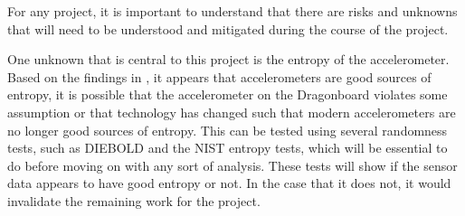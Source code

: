 For any project, it is important to understand that there are risks and unknowns
that will need to be understood and mitigated during the course of the project.

One unknown that is central to this project is the entropy of the accelerometer.
Based on the findings in \cite{voris}, it appears that accelerometers are good
sources of entropy, it is possible that the accelerometer on the Dragonboard
violates some assumption or that technology has changed such that modern
accelerometers are no longer good sources of entropy. This can be tested using
several randomness tests, such as DIEBOLD and the NIST entropy tests, which will
be essential to do before moving on with any sort of analysis.  These tests will
show if the sensor data appears to have good entropy or not.  In the case that
it does not, it would invalidate the remaining work for the project. 


